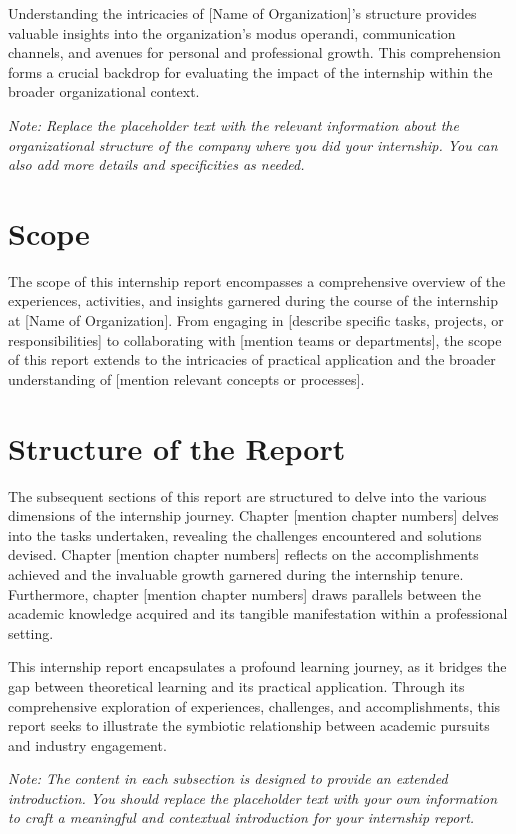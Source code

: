 Understanding the intricacies of [Name of Organization]'s structure provides valuable insights into the organization's modus operandi, communication channels, and avenues for personal and professional growth. This comprehension forms a crucial backdrop for evaluating the impact of the internship within the broader organizational context.

\textit{Note: Replace the placeholder text with the relevant information about the organizational structure of the company where you did your internship. You can also add more details and specificities as needed.}


\section{Scope}
The scope of this internship report encompasses a comprehensive overview of the experiences, activities, and insights garnered during the course of the internship at [Name of Organization]. From engaging in [describe specific tasks, projects, or responsibilities] to collaborating with [mention teams or departments], the scope of this report extends to the intricacies of practical application and the broader understanding of [mention relevant concepts or processes].

\section{Structure of the Report}
The subsequent sections of this report are structured to delve into the various dimensions of the internship journey. Chapter [mention chapter numbers] delves into the tasks undertaken, revealing the challenges encountered and solutions devised. Chapter [mention chapter numbers] reflects on the accomplishments achieved and the invaluable growth garnered during the internship tenure. Furthermore, chapter [mention chapter numbers] draws parallels between the academic knowledge acquired and its tangible manifestation within a professional setting.

This internship report encapsulates a profound learning journey, as it bridges the gap between theoretical learning and its practical application. Through its comprehensive exploration of experiences, challenges, and accomplishments, this report seeks to illustrate the symbiotic relationship between academic pursuits and industry engagement.

\textit{Note: The content in each subsection is designed to provide an extended introduction. You should replace the placeholder text with your own information to craft a meaningful and contextual introduction for your internship report.}

